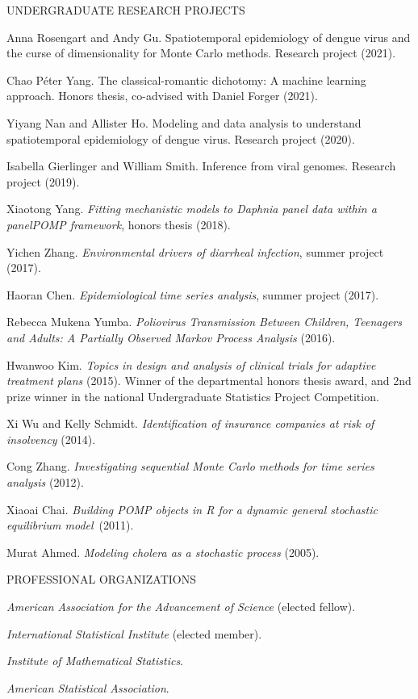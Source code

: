 \lsp
\begin{reflist}{UNDERGRADUATE RESEARCH PROJECTS}
\item{Anna Rosengart and Andy Gu}. Spatiotemporal epidemiology of dengue virus and the curse of dimensionality for Monte Carlo methods. Research project (2021).
  \item{Chao P{\'e}ter Yang}. The classical-romantic dichotomy: A machine learning approach. Honors thesis, co-advised with Daniel Forger (2021).
  \item{Yiyang Nan and Allister Ho}. Modeling and data analysis to understand spatiotemporal epidemiology of dengue virus. Research project (2020).
  \item{Isabella Gierlinger and William Smith}. Inference from viral genomes. Research project (2019).
  \item{Xiaotong Yang}. {\em Fitting mechanistic models to Daphnia panel data within a panelPOMP framework}, honors thesis (2018).
\item{Yichen Zhang}. {\em Environmental drivers of diarrheal infection}, summer project (2017).
\item{Haoran Chen}. {\em Epidemiological time series analysis}, summer project (2017).
\item{Rebecca Mukena Yumba}.  {\em Poliovirus Transmission Between Children, Teenagers and Adults: A Partially Observed Markov Process Analysis} (2016).
\item{Hwanwoo Kim}. {\em Topics in design and analysis of clinical trials for adaptive treatment plans} (2015). Winner of the departmental honors thesis award, and 2nd prize winner in the national Undergraduate Statistics Project Competition.
\item{Xi Wu and Kelly Schmidt}. {\em Identification of insurance companies at risk of insolvency} (2014).
\item{Cong Zhang}. {\em Investigating sequential Monte Carlo methods for time series analysis} (2012).
\item{Xiaoai Chai}. {\em Building POMP objects in R for a dynamic general stochastic equilibrium model}~(2011).  
\item{Murat Ahmed}. {\em Modeling cholera as a stochastic process} (2005).

\end{reflist}


\lsp
\begin{mylist} {PROFESSIONAL ORGANIZATIONS}
\item {\it American Association for the Advancement of Science} (elected fellow). 
\item {\it International Statistical Institute} (elected member).
\item {\it Institute of Mathematical Statistics}.
\item {\it American Statistical Association}.
\end{mylist}

